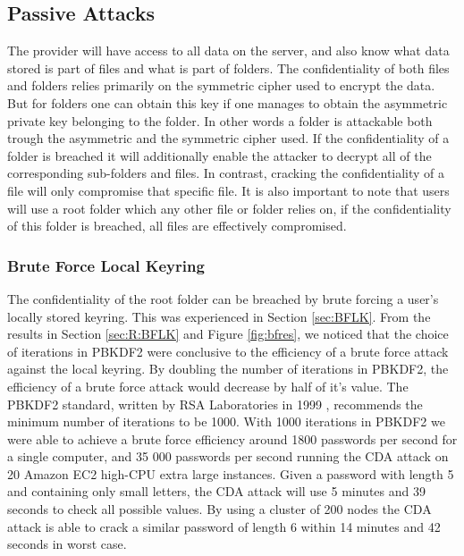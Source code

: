 \documentclass[pdftex,english,10pt,b5paper,twoside]{book}
\begin{document}
\subsection{Passive Attacks}
The provider will have access to all data on the server, and also know what
data stored is part of files and what is part of folders. The confidentiality
of both files and folders relies primarily on the symmetric cipher used to
encrypt the data. But for folders one can obtain this key if one manages to
obtain the asymmetric private key belonging to the folder. In other words a
folder is attackable both trough the asymmetric and the symmetric cipher used.
If the confidentiality of a folder is breached it will additionally enable the
attacker to decrypt all of the corresponding sub-folders and files. In contrast,
cracking the confidentiality of a file will only compromise that specific file. It is
also important to note that users will use a root folder which any other file
or folder relies on, if the confidentiality of this folder is breached, all
files are effectively compromised.

\subsubsection{Brute Force Local Keyring}
The confidentiality of the root folder can be breached by brute forcing a user's
locally stored keyring. This was experienced in Section \ref{sec:BFLK}. From the
results in Section \ref{sec:R:BFLK} and Figure \ref{fig:bfres}, we noticed
that the choice of iterations in PBKDF2 were conclusive to the efficiency of a
brute force attack against the local keyring. By doubling the number of
iterations in PBKDF2, the efficiency of a brute force attack would decrease by
half of it's value. The PBKDF2 standard, written by RSA Laboratories in 1999 \cite{PBKDF2std},
recommends the minimum number of iterations to be 1000. With 1000 iterations in
PBKDF2 we were able to achieve a brute force efficiency around 1800 passwords
per second for a single computer, and 35 000 passwords per second running the
CDA attack on 20 Amazon EC2 high-CPU extra large instances. Given a password
with length 5 and containing only small letters, the CDA attack will use 5
minutes and 39 seconds to check all possible values. By using a cluster of 200
nodes the CDA attack is able to crack a similar password of length 6 within 14 minutes
and 42 seconds in worst case.\\
\end{document}
